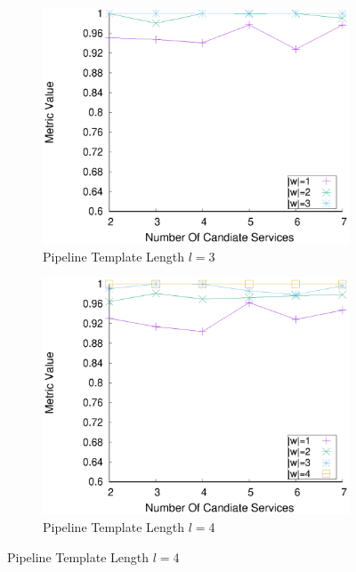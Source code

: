     \begin{figure}[ht!]
      \centering
      \begin{subfigure}{0.49\textwidth}
        \includegraphics[width=\textwidth]{Images/graphs/window_quality_performance_diff_perce_n7_s7_50_89_n3}
        \caption{Pipeline Template Length $l$$=$3}

        \label{fig:quality_window_average_perce_n3}
      \end{subfigure}
      \hfill
      \begin{subfigure}{0.49\textwidth}
        \includegraphics[width=\textwidth]{Images/graphs/window_quality_performance_diff_perce_n7_s7_50_89_n4}
        \caption{Pipeline Template Length $l$$=$4}


\end{subfigure}
\end{figure}
